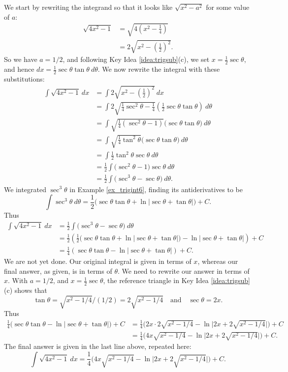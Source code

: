 {We start by rewriting the integrand so that it looks like $\sqrt{x^2-a^2}$ for some value of $a$:
\begin{align*}
\sqrt{4x^2-1} &= \sqrt{4\left(x^2-\frac14\right)}\\
		&= 2\sqrt{x^2-\left(\frac12\right)^2}.
\end{align*}
So we have $a=1/2$, and following Key Idea \ref{idea:trigsub}(c), we set $x= \frac12\sec\theta$, and hence $dx = \frac12\sec\theta\tan\theta\ d\theta$. %
We now rewrite the integral with these substitutions:
\begin{align*}
\int \sqrt{4x^2-1}\ dx &= \int 2\sqrt{x^2-\left(\frac12\right)^2}\ dx\\
			&= \int 2\sqrt{\frac14\sec^2\theta - \frac14}\left(\frac12\sec\theta\tan\theta\right)\ d\theta\\
			&=\int \sqrt{\frac14(\sec^2\theta-1)}\Big(\sec\theta\tan\theta\Big)\ d\theta\\
			&=\int\sqrt{\frac14\tan^2\theta}\Big(\sec\theta\tan\theta\Big)\ d\theta\\
			&=\int \frac12\tan^2\theta\sec\theta\ d\theta\\
			&=\frac12\int \Big(\sec^2\theta-1\Big)\sec\theta\ d\theta\\
			&=\frac12\int \big(\sec^3\theta - \sec\theta\big)\ d\theta.
\end{align*}
We integrated $\sec^3\theta$ in Example \ref{ex_trigint6}, finding its antiderivatives to be
$$\int \sec^3\theta\ d\theta = \frac12\Big(\sec \theta\tan \theta + \ln|\sec \theta+\tan \theta|\Big)+C.$$
Thus
\begin{align*}
\int \sqrt{4x^2-1}\ dx &=\frac12\int \big(\sec^3\theta - \sec\theta\big)\ d\theta\\
			&= \frac12\left(\frac12\Big(\sec \theta\tan \theta + \ln|\sec \theta+\tan \theta|\Big) -\ln|\sec \theta + \tan\theta|\right) + C\\
			&= \frac14\left(\sec\theta\tan\theta -\ln|\sec\theta+\tan\theta|\right)+C.
\end{align*}
We are not yet done. Our original integral is given in terms of $x$, whereas our final answer, as given, is in terms of $\theta$. We need to rewrite our answer in terms of $x$. With $a=1/2$, and $x=\frac12\sec\theta$, the reference triangle in Key Idea \ref{idea:trigsub}(c) shows that 
$$\tan \theta = \sqrt{x^2-1/4}\Big/(1/2) = 2\sqrt{x^2-1/4}\quad \text{and}\quad \sec\theta = 2x.$$
Thus\small 
\begin{align*}
\frac14\Big(\sec\theta\tan\theta -\ln\big|\sec\theta+\tan\theta\big|\Big)+C &=
				\frac14\Big(2x\cdot 2\sqrt{x^2-1/4} - \ln\big|2x + 2\sqrt{x^2-1/4}\big|\Big)+C\\
				&= \frac14\Big(4x\sqrt{x^2-1/4} - \ln\big|2x + 2\sqrt{x^2-1/4}\big|\Big)+C.
\end{align*}
\normalsize 
The final answer is given in the last line above, repeated here:
$$\int \sqrt{4x^2-1}\ dx = \frac14\Big(4x\sqrt{x^2-1/4} - \ln\big|2x + 2\sqrt{x^2-1/4}\big|\Big)+C.$$}

